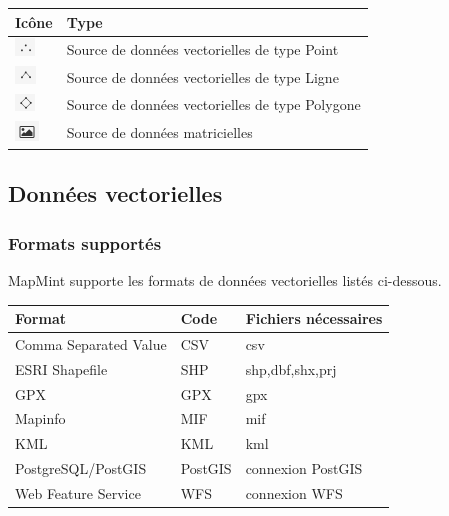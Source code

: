 \documentclass[letterpaper,10pt,french]{sphinxmanual}
\begin{document}
\begin{tabulary}{\linewidth}{|L|L|}
\hline

\textbf{Icône}
 & 
\textbf{Type}
\\
\hline
\includegraphics{data-vector-point-icon.png}
 & 
Source de données vectorielles de type Point
\\
\hline
\includegraphics{data-vector-line-icon.png}
 & 
Source de données vectorielles de type Ligne
\\
\hline
\includegraphics{data-vector-polygon-icon.png}
 & 
Source de données vectorielles de type Polygone
\\
\hline
\includegraphics{data-raster-icon.png}
 & 
Source de données matricielles
\\
\hline\end{tabulary}



\subsection{Données vectorielles}
\label{data/datasources:donnees-vectorielles}

\subsubsection{Formats supportés}
\label{data/datasources:formats-supportes}
MapMint supporte les formats de données vectorielles listés ci-dessous.

\begin{tabulary}{\linewidth}{|L|L|L|}
\hline

\textbf{Format}
 & 
\textbf{Code}
 & 
\textbf{Fichiers nécessaires}
\\
\hline
Comma Separated Value
 & 
CSV
 & 
csv
\\
\hline
ESRI Shapefile
 & 
SHP
 & 
shp,dbf,shx,prj
\\
\hline
GPX
 & 
GPX
 & 
gpx
\\
\hline
Mapinfo
 & 
MIF
 & 
mif
\\
\hline
KML
 & 
KML
 & 
kml
\\
\hline
PostgreSQL/PostGIS
 & 
PostGIS
 & 
connexion PostGIS
\\
\hline
Web Feature Service
 & 
WFS
 & 
connexion WFS
\\
\hline\end{tabulary}
\end{document}
